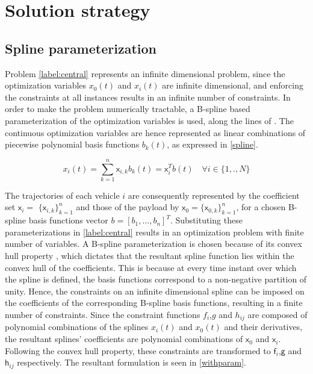 \documentclass[letterpaper, 10 pt, conference]{ieeeconf}
\newcommand{\cx}{\textsf{x}}
\newcommand{\cf}{\textsf{f}}
\newcommand{\cg}{\textsf{g}}
\newcommand{\ch}{\textsf{h}}
\begin{document}
\section{Solution strategy}
\subsection{Spline parameterization}
Problem \eqref{label:central} represents an infinite dimensional problem, since the optimization variables $x_0(t)$ and $x_i(t)$ are infinite dimensional, and enforcing the constraints at all instances results in an infinite number of constraints. In order to make the problem numerically tractable, a B-spline based parameterization of the optimization variables is used, along the lines of \cite{c15}. The continuous optimization variables are hence represented as linear combinations of piecewise polynomial basis functions $b_k(t)$, as expressed in \eqref{spline}.

\begin{equation}\label{spline}
x_i(t) = \sum\limits_{k=1}^{n} \cx_{i,k}b_k(t) = \cx_i^Tb(t) \quad \forall i \in \{1,.,N\}
\end{equation}

 The trajectories of each vehicle $i$ are consequently represented by the coefficient set $\cx_i$$=$ $\{\cx_{i,k}\}_{k=1}^{n}$ and those of the payload by $\cx_0$$=$$\{\cx_{0,k}\}_{k=1}^{n}$, for a chosen B-spline basis functions vector $b = [b_1,\ldots,b_n]^T$. Substituting these parameterizations in \eqref{label:central} results in an optimization problem with finite number of variables. A B-spline parameterization is chosen because of its convex hull property \cite{c15}, which dictates that the resultant spline function lies within the convex hull of the coefficients. This is because at every time instant over which the spline is defined, the basis functions correspond to a non-negative partition of unity. Hence, the constraints on an infinite dimensional spline can be imposed on the coefficients of the corresponding B-spline basis functions, resulting in a finite number of constraints. Since the constraint functions $f_i$,$g$ and $h_{ij}$ are composed of polynomial combinations of the splines $x_i(t)$ and $x_0(t)$ and their derivatives, the resultant splines' coefficients are polynomial combinations of $\cx_0$ and $\cx_i$. Following the convex hull property, these constraints are transformed to $\cf_i$,$\cg$ and $\ch_{ij}$ respectively.
The resultant formulation is seen in \eqref{withparam}.
\end{document}
